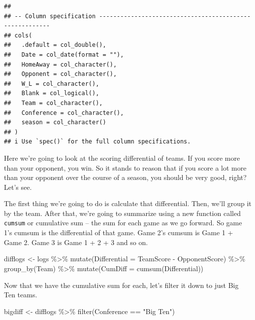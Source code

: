 \documentclass[
]{book}
\newenvironment{Shaded}{\begin{snugshade}}{\end{snugshade}}
\newcommand{\AttributeTok}[1]{\textcolor[rgb]{0.77,0.63,0.00}{#1}}
\newcommand{\FunctionTok}[1]{\textcolor[rgb]{0.00,0.00,0.00}{#1}}
\newcommand{\NormalTok}[1]{#1}
\newcommand{\OtherTok}[1]{\textcolor[rgb]{0.56,0.35,0.01}{#1}}
\newcommand{\SpecialCharTok}[1]{\textcolor[rgb]{0.00,0.00,0.00}{#1}}
\newcommand{\StringTok}[1]{\textcolor[rgb]{0.31,0.60,0.02}{#1}}
\begin{document}
\begin{verbatim}
## 
## -- Column specification --------------------------------------------------------
## cols(
##   .default = col_double(),
##   Date = col_date(format = ""),
##   HomeAway = col_character(),
##   Opponent = col_character(),
##   W_L = col_character(),
##   Blank = col_logical(),
##   Team = col_character(),
##   Conference = col_character(),
##   season = col_character()
## )
## i Use `spec()` for the full column specifications.
\end{verbatim}

Here we're going to look at the scoring differential of teams. If you score more than your opponent, you win. So it stands to reason that if you score a lot more than your opponent over the course of a season, you should be very good, right? Let's see.

The first thing we're going to do is calculate that differential. Then, we'll group it by the team. After that, we're going to summarize using a new function called \texttt{cumsum} or cumulative sum -- the sum for each game as we go forward. So game 1's cumsum is the differential of that game. Game 2's cumsum is Game 1 + Game 2. Game 3 is Game 1 + 2 + 3 and so on.

\begin{Shaded}
\begin{Highlighting}[]
\NormalTok{difflogs }\OtherTok{\textless{}{-}}\NormalTok{ logs }\SpecialCharTok{\%\textgreater{}\%} 
  \FunctionTok{mutate}\NormalTok{(}\AttributeTok{Differential =}\NormalTok{ TeamScore }\SpecialCharTok{{-}}\NormalTok{ OpponentScore) }\SpecialCharTok{\%\textgreater{}\%} 
  \FunctionTok{group\_by}\NormalTok{(Team) }\SpecialCharTok{\%\textgreater{}\%} 
  \FunctionTok{mutate}\NormalTok{(}\AttributeTok{CumDiff =} \FunctionTok{cumsum}\NormalTok{(Differential))}
\end{Highlighting}
\end{Shaded}

Now that we have the cumulative sum for each, let's filter it down to just Big Ten teams.

\begin{Shaded}
\begin{Highlighting}[]
\NormalTok{bigdiff }\OtherTok{\textless{}{-}}\NormalTok{ difflogs }\SpecialCharTok{\%\textgreater{}\%} \FunctionTok{filter}\NormalTok{(Conference }\SpecialCharTok{==} \StringTok{"Big Ten"}\NormalTok{)}
\end{Highlighting}
\end{Shaded}
\end{document}
